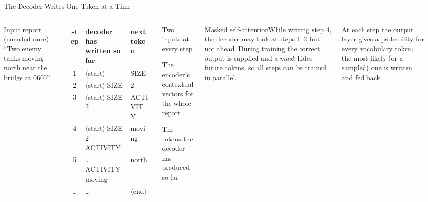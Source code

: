 \documentclass[aspectratio=169,10pt]{beamer}
\begin{document}
\begin{frame}{The Decoder Writes One Token at a Time}
\begin{columns}[T]
\scriptsize Input report (encoded once): ``Two enemy tanks moving north near the bridge at 0600''
\vspace{3pt}

\centering\scriptsize\renewcommand{\arraystretch}{1.2}
\begin{tabular}{cll}
\toprule\textbf{step}&\textbf{decoder has written so far}&\textbf{next token}\\\midrule
1&$\langle$start$\rangle$&SIZE\\
2&$\langle$start$\rangle$ SIZE&2\\
3&$\langle$start$\rangle$ SIZE 2&ACTIVITY\\
4&$\langle$start$\rangle$ SIZE 2 ACTIVITY&moving\\
5&\dots ACTIVITY moving&north\\
\dots&\dots&$\langle$end$\rangle$\\\bottomrule
\end{tabular}
\begin{cbox}{Two inputs at every step}\scriptsize
\begin{te}
\item The encoder's contextual vectors for the whole report
\item The tokens the decoder has produced so far
\end{te}
\end{cbox}
\begin{cbox}{Masked self-attention}\scriptsize While writing step 4, the decoder may look at steps 1--3 but not ahead. During training the correct output is supplied and a \emph{mask} hides future tokens, so all steps can be trained in parallel.\end{cbox}
\begin{ibox}\scriptsize At each step the output layer gives a probability for every vocabulary token; the most likely (or a sampled) one is written and fed back.\end{ibox}
\end{columns}
\end{frame}
\end{document}
